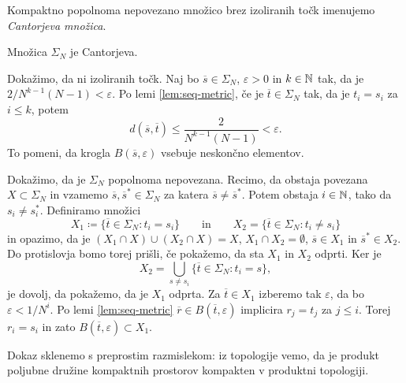 \begin{definicija}
    Kompaktno popolnoma nepovezano množico brez izoliranih točk imenujemo \emph{Cantorjeva množica}.
\end{definicija}

\begin{trditev}
    Množica \(\Sigma_N\) je Cantorjeva.
\end{trditev}

\begin{dokaz}
    Dokažimo, da ni izoliranih točk. Naj bo \(\overline{s} \in \Sigma_N\), \(\varepsilon > 0\) in \(k \in \mathbb N\) tak, da je \(2/N^{k - 1} (N -1) < \varepsilon\). Po lemi \ref{lem:seq-metric}, če je \(\overline{t} \in \Sigma_N\) tak, da je \(t_i = s_i\) za \(i \leq k\), potem
    \[d (\overline{s}, \overline{t}) \leq \frac{2}{N^{k - 1} (N - 1)} < \varepsilon.\]
    To pomeni, da krogla \(B (\overline{s}, \varepsilon)\) vsebuje neskončno elementov.

    Dokažimo, da je \(\Sigma_N\) popolnoma nepovezana. Recimo, da obstaja povezana \(X \subset \Sigma_N\) in vzamemo \(\overline{s}, \overline{s}^* \in \Sigma_N\) za katera \(\overline{s} \neq \overline{s}^*\). Potem obstaja \(i \in \mathbb N\), tako da \(s_i \neq s_i^*\). Definiramo množici
    \[X_1 \coloneq \bigl\{ \overline{t} \in \Sigma_N : t_i = s_i \bigr\} \qquad \text{in} \qquad X_2 = \bigl\{\overline{t} \in \Sigma_N : t_i \neq s_i\bigr\}\]
    in opazimo, da je \((X_1 \cap X) \cup (X_2 \cap X) = X\), \(X_1 \cap X_2 = \emptyset\), \(\overline{s} \in X_1\) in \(\overline{s}^* \in X_2\). Do protislovja bomo torej prišli, če pokažemo, da sta \(X_1\) in \(X_2\) odprti. Ker je
    \[X_2 = \bigcup_{s \neq s_i} \bigl\{ \overline{t} \in \Sigma_N : t_i = s \bigr\},\]
    je dovolj, da pokažemo, da je \(X_1\) odprta. Za \(\overline{t} \in X_1\) izberemo tak \(\varepsilon\), da bo \(\varepsilon < 1 / N^i\). Po lemi \ref{lem:seq-metric} \(\overline{r} \in B (\overline{t}, \varepsilon)\) implicira \(r_j = t_j\) za \(j \leq i\). Torej \(r_i = s_i\) in zato \(B (\overline{t}, \varepsilon) \subset X_1\).

    Dokaz sklenemo s preprostim razmislekom: iz topologije vemo, da je produkt poljubne družine kompaktnih prostorov kompakten v produktni topologiji.
\end{dokaz}
